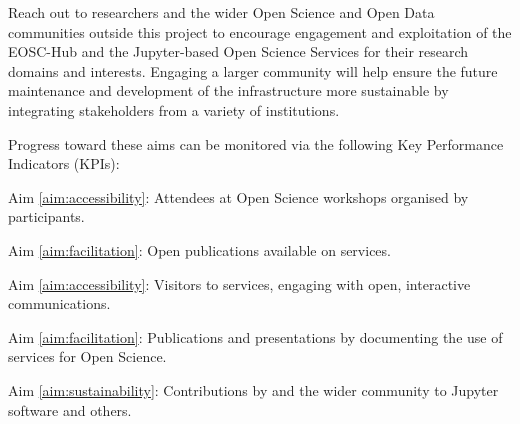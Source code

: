 \begin{compactenum}
\item \label{obj:outreach-and-engagement}
  Reach out to researchers and the wider Open Science and Open Data
  communities outside this project to encourage engagement
  and exploitation of the EOSC-Hub and the Jupyter-based Open Science
  Services for their research domains and interests.
  Engaging a larger community will help ensure the
  future maintenance and development of the infrastructure more sustainable
  by integrating stakeholders from a variety of institutions.

\end{compactenum}

\noindent Progress toward these aims can be monitored via the following
Key Performance Indicators (KPIs):

\begin{compactenum}
  \item \label{kpi:workshop-attendees}
    Aim \ref{aim:accessibility}:
    Attendees at Open Science workshops organised by \TheProject participants.
  \item \label{kpi:binder-publications}
    Aim \ref{aim:facilitation}:
    Open publications available on \TheProject services.
  \item \label{kpi:binder-visits}
    Aim \ref{aim:accessibility}:
    Visitors to \TheProject services, engaging with open, interactive communications.
  \item \label{kpi:dissemination}
    Aim \ref{aim:facilitation}:
    Publications and presentations by \TheProject documenting the use of \TheProject services for Open Science.
  \item \label{kpi:contributions}
    Aim \ref{aim:sustainability}:
    Contributions by \TheProject and the wider community to Jupyter software and others.
\end{compactenum}



